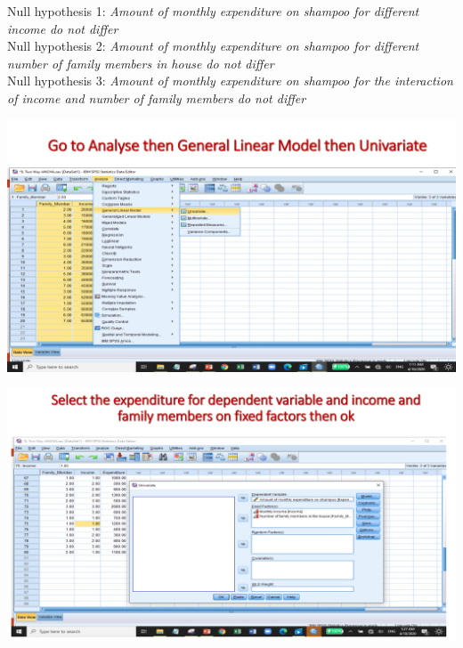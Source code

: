 \documentclass[
  letterpaper,
  DIV=11,
  numbers=noendperiod]{scrreprt}
\begin{document}
\begin{tcolorbox}[enhanced jigsaw, rightrule=.15mm, arc=.35mm, colframe=quarto-callout-note-color-frame, coltitle=black, left=2mm, colbacktitle=quarto-callout-note-color!10!white, bottomtitle=1mm, titlerule=0mm, colback=white, breakable, opacitybacktitle=0.6, opacityback=0, toprule=.15mm, toptitle=1mm, title=\textcolor{quarto-callout-note-color}{\faInfo}\hspace{0.5em}{Hypothesis to test by Two-way ANOVA}, bottomrule=.15mm, leftrule=.75mm]

Null hypothesis 1: \emph{Amount of monthly expenditure on shampoo for
different income do not differ}\\

Null hypothesis 2: \emph{Amount of monthly expenditure on shampoo for
different number of family members in house do not differ}\\

Null hypothesis 3: \emph{Amount of monthly expenditure on shampoo for
the interaction of income and number of family members do not differ}\\

\end{tcolorbox}

\includegraphics{images/slides/img_Page_117.png}

\includegraphics{images/slides/img_Page_118.png}
\end{document}
